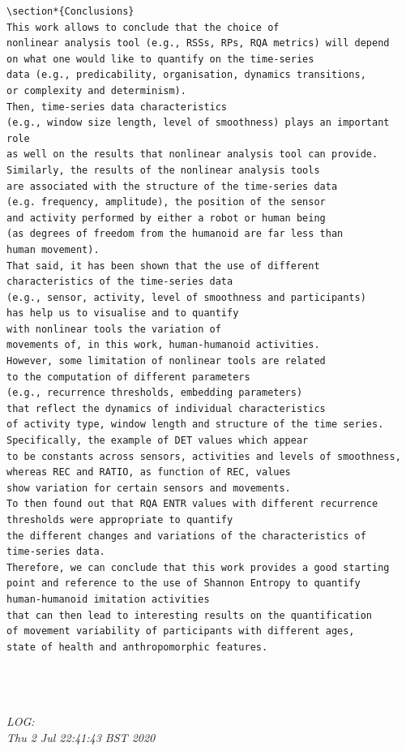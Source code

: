 \documentclass[10pt]{article}
\begin{document}
\begin{enumerate}
\begin{verbatim}
\section*{Conclusions}
This work allows to conclude that the choice of 
nonlinear analysis tool (e.g., RSSs, RPs, RQA metrics) will depend 
on what one would like to quantify on the time-series 
data (e.g., predicability, organisation, dynamics transitions, 
or complexity and determinism).
Then, time-series data characteristics 
(e.g., window size length, level of smoothness) plays an important role
as well on the results that nonlinear analysis tool can provide.
Similarly, the results of the nonlinear analysis tools
are associated with the structure of the time-series data 
(e.g. frequency, amplitude), the position of the sensor 
and activity performed by either a robot or human being
(as degrees of freedom from the humanoid are far less than
human movement). 
That said, it has been shown that the use of different 
characteristics of the time-series data 
(e.g., sensor, activity, level of smoothness and participants)
has help us to visualise and to quantify 
with nonlinear tools the variation of 
movements of, in this work, human-humanoid activities.
However, some limitation of nonlinear tools are related 
to the computation of different parameters 
(e.g., recurrence thresholds, embedding parameters)
that reflect the dynamics of individual characteristics 
of activity type, window length and structure of the time series.
Specifically, the example of DET values which appear 
to be constants across sensors, activities and levels of smoothness, 
whereas REC and RATIO, as function of REC, values 
show variation for certain sensors and movements. 
To then found out that RQA ENTR values with different recurrence 
thresholds were appropriate to quantify 
the different changes and variations of the characteristics of 
time-series data.
Therefore, we can conclude that this work provides a good starting 
point and reference to the use of Shannon Entropy to quantify 
human-humanoid imitation activities 
that can then lead to interesting results on the quantification 
of movement variability of participants with different ages, 
state of health and anthropomorphic features.


	
	\end{verbatim}
	\textit{
	LOG: \\
	Thu  2 Jul 22:41:43 BST 2020 \\
	}
	\\


\end{enumerate}
\end{document}
